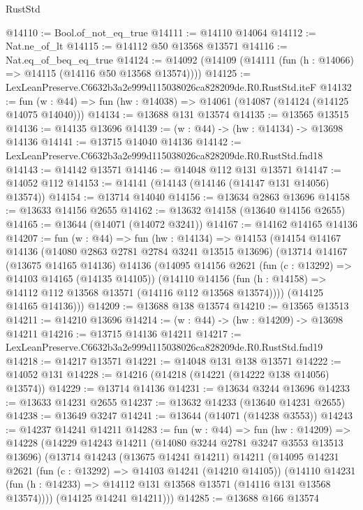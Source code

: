 \begin{lexlean}{RustStd}
\begin{coremodule}
@14110 := Bool.of_not_eq_true
@14111 := @14110 @14064
@14112 := Nat.ne_of_lt
@14115 := @14112 @50 @13568 @13571
@14116 := Nat.eq_of_beq_eq_true
@14124 := @14092 (@14109 (@14111 (fun (h : @14066) => @14115 (@14116 @50 @13568 @13574))))
@14125 := LexLeanPreserve.C6632b3a2e999d115038026ca828209de.R0.RustStd.iteF
@14132 := fun (w : @44) => fun (hw : @14038) => @14061 (@14087 (@14124 (@14125 @14075 @14040)))
@14134 := @13688 @131 @13574
@14135 := @13565 @13515
@14136 := @14135 @13696
@14139 := (w : @44) -> (hw : @14134) -> @13698 @14136
@14141 := @13715 @14040 @14136
@14142 := LexLeanPreserve.C6632b3a2e999d115038026ca828209de.R0.RustStd.fnd18
@14143 := @14142 @13571
@14146 := @14048 @112 @131 @13571
@14147 := @14052 @112
@14153 := @14141 (@14143 (@14146 (@14147 @131 @14056) @13574))
@14154 := @13714 @14040
@14156 := @13634 @2863 @13696
@14158 := @13633 @14156 @2655
@14162 := @13632 @14158 (@13640 @14156 @2655)
@14165 := @13644 (@14071 (@14072 @3241))
@14167 := @14162 @14165 @14136
@14207 := fun (w : @44) =>
  fun (hw : @14134) =>
  @14153
    (@14154
      @14167
      @14136
      (@14080 @2863 @2781 @2784 @3241 @13515 @13696)
      (@13714
        @14167
        (@13675 @14165 @14136)
        @14136
        (@14095
          @14156
          @2621
          (fun (c : @13292) => @14103 @14165 (@14135 @14105))
          (@14110
            @14156
            (fun (h : @14158) => @14112 @112 @13568 @13571 (@14116 @112 @13568 @13574))))
        (@14125 @14165 @14136)))
@14209 := @13688 @138 @13574
@14210 := @13565 @13513
@14211 := @14210 @13696
@14214 := (w : @44) -> (hw : @14209) -> @13698 @14211
@14216 := @13715 @14136 @14211
@14217 := LexLeanPreserve.C6632b3a2e999d115038026ca828209de.R0.RustStd.fnd19
@14218 := @14217 @13571
@14221 := @14048 @131 @138 @13571
@14222 := @14052 @131
@14228 := @14216 (@14218 (@14221 (@14222 @138 @14056) @13574))
@14229 := @13714 @14136
@14231 := @13634 @3244 @13696
@14233 := @13633 @14231 @2655
@14237 := @13632 @14233 (@13640 @14231 @2655)
@14238 := @13649 @3247
@14241 := @13644 (@14071 (@14238 @3553))
@14243 := @14237 @14241 @14211
@14283 := fun (w : @44) =>
  fun (hw : @14209) =>
  @14228
    (@14229
      @14243
      @14211
      (@14080 @3244 @2781 @3247 @3553 @13513 @13696)
      (@13714
        @14243
        (@13675 @14241 @14211)
        @14211
        (@14095
          @14231
          @2621
          (fun (c : @13292) => @14103 @14241 (@14210 @14105))
          (@14110
            @14231
            (fun (h : @14233) => @14112 @131 @13568 @13571 (@14116 @131 @13568 @13574))))
        (@14125 @14241 @14211)))
@14285 := @13688 @166 @13574

\end{coremodule}
\end{lexlean}
